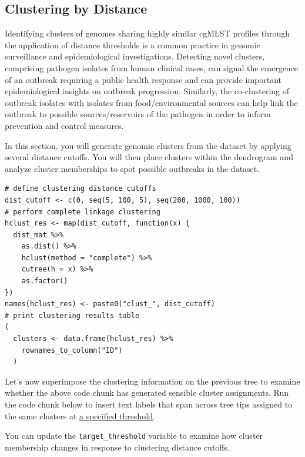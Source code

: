 \documentclass[
]{book}
\begin{document}
\subsection{Clustering by Distance}\label{clustering-by-distance}

Identifying clusters of genomes sharing highly similar cgMLST profiles through the application of distance thresholds is a common practice in genomic surveillance and epidemiological investigations. Detecting novel clusters, comprising pathogen isolates from human clinical cases, can signal the emergence of an outbreak requiring a public health response and can provide important epidemiological insights on outbreak progression. Similarly, the co-clustering of outbreak isolates with isolates from food/environmental sources can help link the outbreak to possible sources/reservoirs of the pathogen in order to inform prevention and control measures.

In this section, you will generate genomic clusters from the dataset by applying several distance cutoffs. You will then place clusters within the dendrogram and analyze cluster memberships to spot possible outbreaks in the dataset.

\begin{verbatim}
# define clustering distance cutoffs
dist_cutoff <- c(0, seq(5, 100, 5), seq(200, 1000, 100))
# perform complete linkage clustering
hclust_res <- map(dist_cutoff, function(x) {
  dist_mat %>% 
    as.dist() %>% 
    hclust(method = "complete") %>% 
    cutree(h = x) %>% 
    as.factor()
})
names(hclust_res) <- paste0("clust_", dist_cutoff)
# print clustering results table
(
  clusters <- data.frame(hclust_res) %>% 
    rownames_to_column("ID")
  )
\end{verbatim}

Let's now superimpose the clustering information on the previous tree to examine whether the above code chunk has generated sensible cluster assignments. Run the code chunk below to insert text labels that span across tree tips assigned to the same clusters at \ul{a specified threshold}.

You can update the \texttt{target\_threshold} variable to examine how cluster membership changes in response to clustering distance cutoffs.
\end{document}

